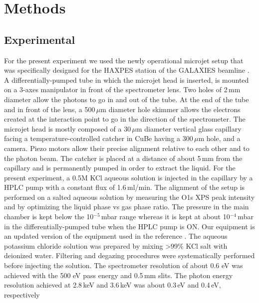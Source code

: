 \section{Methods} \label{sec:methods}
\subsection{Experimental}
For the present experiment we used the newly operational microjet setup that was specifically designed for the HAXPES station of the GALAXIES beamline \citep{ceolin13:188,rueff15:175}. A differentially-pumped tube in which the microjet head is inserted, is mounted on a 3-axes manipulator in front of the spectrometer lens. Two holes of 2\,mm diameter allow the photons to go in and out of the tube. At the end of the tube and in front of the lens, a 500\,$\mu$m diameter hole skimmer allows the electrons created at the interaction point to go in the direction of the spectrometer. The microjet head is mostly composed of a 30\,$\mu$m diameter vertical glass capillary facing a temperature-controlled catcher in CuBe having a 300\,$\mu$m hole, and a camera. Piezo motors allow their precise alignment relative to each other and to the photon beam. The catcher is placed at a distance of about 5\,mm from the capillary and is permanently pumped in order to extract the liquid. For the present experiment, a 0.5M KCl aqueous solution is injected in the capillary by a HPLC pump with a constant flux of 1.6\,ml/min. The alignment of the setup is performed on a salted aqueous solution by measuring the O1s XPS peak intensity and by optimizing the liquid phase vs gas phase ratio. The pressure in the main chamber is kept below the 10$^{−5}$\,mbar range whereas it is kept at about 10$^{−4}$\,mbar in the differentially-pumped tube when the HPLC pump is ON. Our equipment is an updated version of the equipment used in the reference \cite{faubel88:269}. The aqueous potassium chloride solution was prepared by mixing >99\% KCl salt with deionized water. Filtering and degazing procedures were systematically performed before injecting the solution. The spectrometer resolution of about 0.6 eV was achieved with the 500 eV pass energy and 0.5\,mm slits. The photon energy resolution achieved at 2.8\,keV and 3.6\,keV was about 0.3\,eV and 0.4\,eV, respectively

